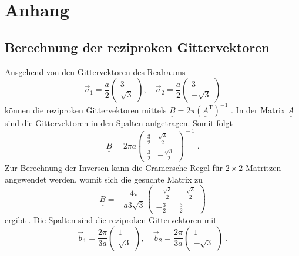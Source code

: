 \chapter{Anhang}
\section{Berechnung der reziproken Gittervektoren}
\label{sec:rez_lattivectors_calc}
Ausgehend von den Gittervektoren des Realraums 
\begin{equation*}
    \vec{a}_1 = \frac{a}{2}\begin{pmatrix} 3 \\[4pt] \sqrt{3}  \end{pmatrix}, \quad
    \vec{a}_2 = \frac{a}{2}\begin{pmatrix} 3 \\[4pt] -\sqrt{3} \end{pmatrix}       
\end{equation*}   
können die reziproken Gittervektoren mittels $\underline{\underline{B}} = 2\pi \left ( \underline{\underline{A}}^\text{T} \right )^{-1} $ \cite{suter}.
In der Matrix $\underline{\underline{A}}$ sind die Gittervektoren in den Spalten aufgetragen.
Somit folgt 
\begin{equation*}
    \underline{\underline{B}} = 2 \pi a
    \begin{pmatrix}
        \frac{3}{2} & \frac{\sqrt{3}}{2}  \\[0.35em]
        \frac{3}{2} & -\frac{\sqrt{3}}{2}
    \end{pmatrix}^{\! -1} \; .
\end{equation*}
Zur Berechnung der Inversen kann die Cramersche Regel für $2\times 2$ Matritzen angewendet werden, womit sich die gesuchte Matrix zu
\begin{equation*}
    \underline{\underline{B}} = - \frac{4\pi}{a3\sqrt{3}}
    \begin{pmatrix}
        -\frac{\sqrt{3}}{2} & -\frac{\sqrt{3}}{2}  \\[0.35em]
        -\frac{3}{2} & \frac{3}{2}
    \end{pmatrix}
\end{equation*}
ergibt \cite{Cramer}.
Die Spalten sind die reziproken Gittervektoren mit 
\begin{equation*}
    \vec{b}_1 = \frac{2\pi}{3a}\begin{pmatrix} 1        \\[4pt]     \sqrt{3}  \end{pmatrix}, \quad
    \vec{b}_2 = \frac{2\pi}{3a}\begin{pmatrix} 1        \\[4pt] -   \sqrt{3} \end{pmatrix}   \; .  
\end{equation*}
